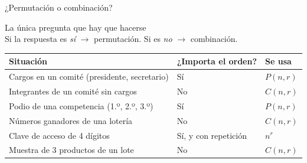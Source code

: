 \documentclass[aspectratio=169,10pt]{beamer}
\begin{document}
\begin{frame}{¿Permutación o combinación?}
  \begin{block}{La única pregunta que hay que hacerse}
    \centering\small
    \\[0.2em]
    Si la respuesta es \emph{sí} $\rightarrow$ permutación. \quad
    Si es \emph{no} $\rightarrow$ combinación.
  \end{block}

  \vspace{0.2cm}
  \footnotesize
  \begin{center}
  \begin{tabular}{@{}lll@{}}
    \toprule
    \textbf{Situación} & \textbf{¿Importa el orden?} & \textbf{Se usa} \\
    \midrule
    Cargos en un comité (presidente, secretario)  & Sí & $P(n,r)$ \\
    Integrantes de un comité sin cargos           & No & $C(n,r)$ \\
    Podio de una competencia (1.º, 2.º, 3.º)      & Sí & $P(n,r)$ \\
    Números ganadores de una lotería              & No & $C(n,r)$ \\
    Clave de acceso de 4 dígitos                  & Sí, y con repetición & $n^{r}$ \\
    Muestra de 3 productos de un lote             & No & $C(n,r)$ \\
    \bottomrule
  \end{tabular}
  \end{center}
\end{frame}
\end{document}
